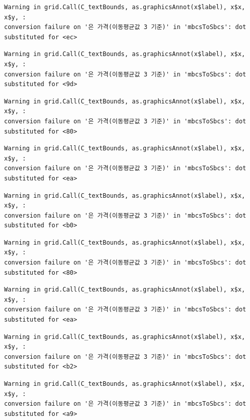 \documentclass[
  letterpaper,
  DIV=11,
  numbers=noendperiod]{scrreprt}
\begin{document}
\begin{verbatim}
Warning in grid.Call(C_textBounds, as.graphicsAnnot(x$label), x$x, x$y, :
conversion failure on '은 가격(이동평균값 3 기준)' in 'mbcsToSbcs': dot
substituted for <ec>
\end{verbatim}

\begin{verbatim}
Warning in grid.Call(C_textBounds, as.graphicsAnnot(x$label), x$x, x$y, :
conversion failure on '은 가격(이동평균값 3 기준)' in 'mbcsToSbcs': dot
substituted for <9d>
\end{verbatim}

\begin{verbatim}
Warning in grid.Call(C_textBounds, as.graphicsAnnot(x$label), x$x, x$y, :
conversion failure on '은 가격(이동평균값 3 기준)' in 'mbcsToSbcs': dot
substituted for <80>
\end{verbatim}

\begin{verbatim}
Warning in grid.Call(C_textBounds, as.graphicsAnnot(x$label), x$x, x$y, :
conversion failure on '은 가격(이동평균값 3 기준)' in 'mbcsToSbcs': dot
substituted for <ea>
\end{verbatim}

\begin{verbatim}
Warning in grid.Call(C_textBounds, as.graphicsAnnot(x$label), x$x, x$y, :
conversion failure on '은 가격(이동평균값 3 기준)' in 'mbcsToSbcs': dot
substituted for <b0>
\end{verbatim}

\begin{verbatim}
Warning in grid.Call(C_textBounds, as.graphicsAnnot(x$label), x$x, x$y, :
conversion failure on '은 가격(이동평균값 3 기준)' in 'mbcsToSbcs': dot
substituted for <80>
\end{verbatim}

\begin{verbatim}
Warning in grid.Call(C_textBounds, as.graphicsAnnot(x$label), x$x, x$y, :
conversion failure on '은 가격(이동평균값 3 기준)' in 'mbcsToSbcs': dot
substituted for <ea>
\end{verbatim}

\begin{verbatim}
Warning in grid.Call(C_textBounds, as.graphicsAnnot(x$label), x$x, x$y, :
conversion failure on '은 가격(이동평균값 3 기준)' in 'mbcsToSbcs': dot
substituted for <b2>
\end{verbatim}

\begin{verbatim}
Warning in grid.Call(C_textBounds, as.graphicsAnnot(x$label), x$x, x$y, :
conversion failure on '은 가격(이동평균값 3 기준)' in 'mbcsToSbcs': dot
substituted for <a9>
\end{verbatim}
\end{document}
